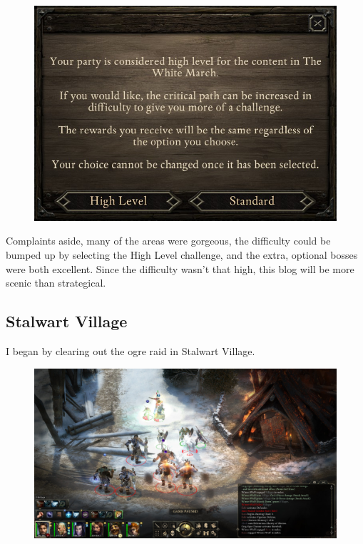 \documentclass{article}
\begin{document}
\begin{figure}
\includegraphics[scale=0.7]{files/blog/2019_08_17_poe_potd_wmpt1/2019_08_17_high_level.jpg}
\end{figure}

Complaints aside, many of the areas were gorgeous, the difficulty could be bumped up by selecting the High Level challenge, and the extra, optional bosses were both excellent.  Since the difficulty wasn't that high, this blog will be more scenic than strategical.

\subsection{Stalwart Village}
I began by clearing out the ogre raid in Stalwart Village.

\begin{figure}
\includegraphics[scale=0.33]{files/blog/2019_08_17_poe_potd_wmpt1/2019_08_17_stalwart_1.jpg}
\end{figure}
\end{document}
